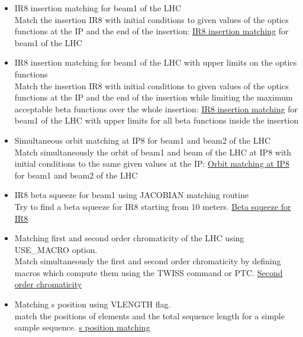 \begin{itemize}
	\item IR8 insertion matching for beam1 of the LHC\\
	Match the insertion IR8 with initial conditions to given values
        of the optics  functions at the IP and the end of the insertion:  
        \href{http://cern.ch/madx/madX/examples/match/lhc.insertion/job.lhc.insertion.madx}{IR8
          insertion matching} for beam1 of the LHC 
	
	\item IR8 insertion matching for beam1 of the LHC with upper
          limits on the optics functions\\ 
	Match the insertion IR8 with initial conditions to given values
        of the optics  functions at the IP and the end of the insertion
        while limiting the maximum acceptable beta functions over the
        whole insertion:  
        \href{http://cern.ch/madx/madX/examples/match/lhc.insertion-upper/job.lhc.insertion-upper.madx}{IR8
          insertion matching} for beam1 of the LHC with upper limits for
        all beta functions inside the insertion 
	
	\item Simultaneous orbit matching at IP8 for beam1 and beam2 of
          the LHC\\ 
	Match simultaneously the orbit of beam1 and beam of the LHC at
        IP8  with initial conditions to the same given values at the IP:  
        \href{http://cern.ch/madx/madX/examples/match/lhc.iporbit/job.lhc.iporbit.madx}{Orbit
          matching at IP8} for beam1 and beam2 of the LHC 
	
	\item IR8 beta squeeze for beam1 using JACOBIAN matching routine\\
	Try to find a beta squeeze for IR8 starting from 10 meters. 
        \href{http://cern.ch/madx/madX/examples/match/lhcV65.ir8squeeze/job.lhcV65.ir8squeeze.madx}{Beta
          squeeze for IR8} 
	
	\item Matching first and second order chromaticity of the LHC
          using USE\_MACRO option. \\
	Match simultaneously the first and second order chromaticity by
        defining macros which compute them using the TWISS command or
        PTC.  
        \href{http://cern.ch/madx/madX/examples/match/lhc.qpp/job.lhc.qpp.madx}{Second
          order chromaticity} 
	
	\item Matching s position using VLENGTH flag.\\
	match the positions of elements and the total sequence length
        for a simple sample sequence.  
        \href{http://cern.ch/madx/madX/examples/match/s-match/job.s-match.madx}{s position matching}
	

\end{itemize}

